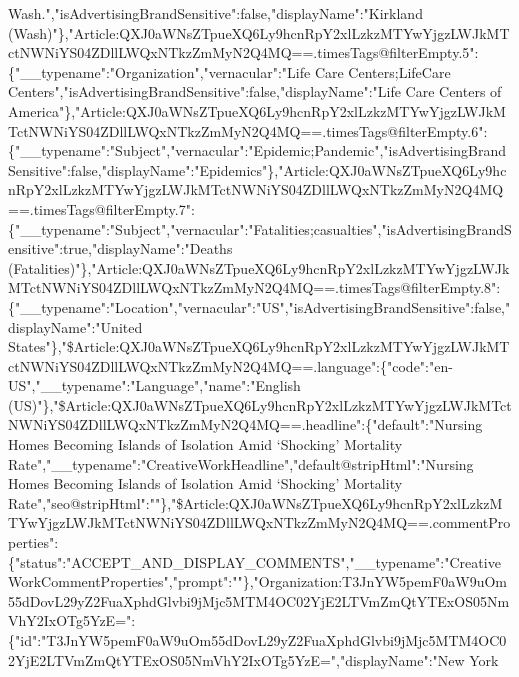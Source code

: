 Wash.","isAdvertisingBrandSensitive":false,"displayName":"Kirkland
(Wash)"\},"Article:QXJ0aWNsZTpueXQ6Ly9hcnRpY2xlLzkzMTYwYjgzLWJkMTctNWNiYS04ZDllLWQxNTkzZmMyN2Q4MQ==.timesTags@filterEmpty.5":\{"\_\_typename":"Organization","vernacular":"Life
Care Centers;LifeCare
Centers","isAdvertisingBrandSensitive":false,"displayName":"Life Care
Centers of
America"\},"Article:QXJ0aWNsZTpueXQ6Ly9hcnRpY2xlLzkzMTYwYjgzLWJkMTctNWNiYS04ZDllLWQxNTkzZmMyN2Q4MQ==.timesTags@filterEmpty.6":\{"\_\_typename":"Subject","vernacular":"Epidemic;Pandemic","isAdvertisingBrandSensitive":false,"displayName":"Epidemics"\},"Article:QXJ0aWNsZTpueXQ6Ly9hcnRpY2xlLzkzMTYwYjgzLWJkMTctNWNiYS04ZDllLWQxNTkzZmMyN2Q4MQ==.timesTags@filterEmpty.7":\{"\_\_typename":"Subject","vernacular":"Fatalities;casualties","isAdvertisingBrandSensitive":true,"displayName":"Deaths
(Fatalities)"\},"Article:QXJ0aWNsZTpueXQ6Ly9hcnRpY2xlLzkzMTYwYjgzLWJkMTctNWNiYS04ZDllLWQxNTkzZmMyN2Q4MQ==.timesTags@filterEmpty.8":\{"\_\_typename":"Location","vernacular":"US","isAdvertisingBrandSensitive":false,"displayName":"United
States"\},"\$Article:QXJ0aWNsZTpueXQ6Ly9hcnRpY2xlLzkzMTYwYjgzLWJkMTctNWNiYS04ZDllLWQxNTkzZmMyN2Q4MQ==.language":\{"code":"en-US","\_\_typename":"Language","name":"English
(US)"\},"\$Article:QXJ0aWNsZTpueXQ6Ly9hcnRpY2xlLzkzMTYwYjgzLWJkMTctNWNiYS04ZDllLWQxNTkzZmMyN2Q4MQ==.headline":\{"default":"Nursing
Homes Becoming Islands of Isolation Amid `Shocking' Mortality
Rate","\_\_typename":"CreativeWorkHeadline","default@stripHtml":"Nursing
Homes Becoming Islands of Isolation Amid `Shocking' Mortality
Rate","seo@stripHtml":""\},"\$Article:QXJ0aWNsZTpueXQ6Ly9hcnRpY2xlLzkzMTYwYjgzLWJkMTctNWNiYS04ZDllLWQxNTkzZmMyN2Q4MQ==.commentProperties":\{"status":"ACCEPT\_AND\_DISPLAY\_COMMENTS","\_\_typename":"CreativeWorkCommentProperties","prompt":""\},"Organization:T3JnYW5pemF0aW9uOm55dDovL29yZ2FuaXphdGlvbi9jMjc5MTM4OC02YjE2LTVmZmQtYTExOS05NmVhY2IxOTg5YzE=":\{"id":"T3JnYW5pemF0aW9uOm55dDovL29yZ2FuaXphdGlvbi9jMjc5MTM4OC02YjE2LTVmZmQtYTExOS05NmVhY2IxOTg5YzE=","displayName":"New
York
